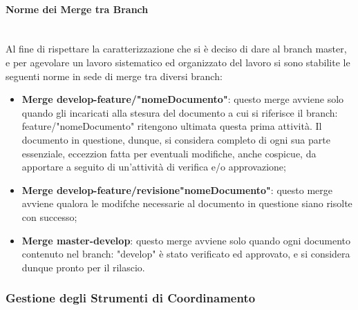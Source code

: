\paragraph{Norme dei Merge tra Branch} ~\\
	Al fine di rispettare la caratterizzazione che si è deciso di dare al branch master, e per agevolare un lavoro sistematico ed organizzato del lavoro si sono stabilite le seguenti norme in sede di merge tra diversi branch:
	\begin{itemize}
	\item \textbf{Merge develop-feature/"nomeDocumento"}: questo merge avviene solo quando gli incaricati alla stesura del documento a cui si riferisce il branch: feature/"nomeDocumento" ritengono ultimata questa prima attività. Il documento in questione, dunque, si considera completo di ogni sua parte essenziale, eccezzion fatta per eventuali modifiche, anche cospicue, da apportare a seguito di un'attività di verifica e/o approvazione;
	\item \textbf{Merge develop-feature/revisione"nomeDocumento"}: questo merge avviene qualora le modifche necessarie al documento in questione siano risolte con successo;
	\item \textbf{Merge master-develop}: questo merge avviene solo quando ogni documento contenuto nel branch: "develop" è stato verificato ed approvato, e si considera dunque pronto per il rilascio.
	\end{itemize}


\subsubsection{Gestione degli Strumenti di Coordinamento}

